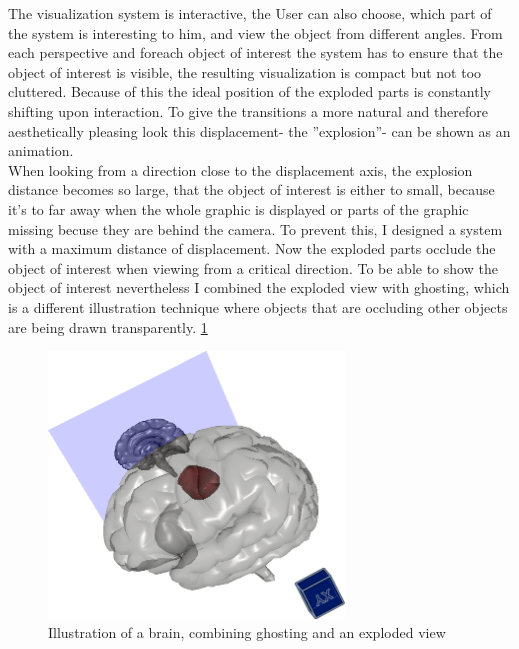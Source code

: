 The visualization system is interactive, the User can also choose, which part of the system is interesting to him, and view the object from different angles. From each perspective and foreach object of interest the system has to ensure that the object of interest is visible, the resulting visualization is compact but not too cluttered.  Because of this the ideal position of the exploded parts is constantly shifting upon interaction. To give the transitions a more natural and therefore aesthetically pleasing look this displacement- the ''explosion''- can be shown as an animation.\\
When looking from a direction close to the displacement axis, the explosion distance becomes so large, that the object of interest is either to small, because it's to far away when the whole graphic is displayed or parts of the graphic missing becuse they are behind the camera.
To prevent this, I designed a system with a maximum distance of displacement. Now the exploded parts occlude the object of interest when viewing from a critical direction. To be able to show the object of interest nevertheless I combined the exploded view with ghosting, which is a different illustration technique where objects that are occluding other objects are being drawn transparently. \ref{fig:demo}\\
\begin{figure}[tb]
	\centering
	\includegraphics[width=0.7\textwidth]{chapters/figures/demo}
	\caption{Illustration of a brain, combining ghosting and an exploded view}
	\label{fig:demo}
\end{figure}